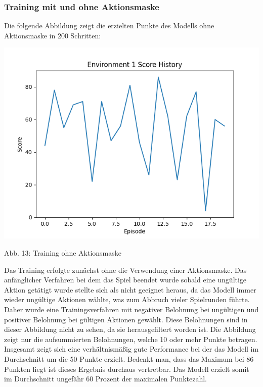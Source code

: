 \subsubsection{Training mit und ohne Aktionsmaske}
\begin{minipage}{\linewidth}
	Die folgende Abbildung zeigt die erzielten Punkte des Modells ohne Aktionsmaske in 200 Schritten:
	
	\vspace{0.5cm}
	\includegraphics[width=1\textwidth]{Bilder/trainingwithoutcancalation}
	
	Abb. 13: Training ohne Aktionsmaske\\
\end{minipage}

Das Training erfolgte zunächst ohne die Verwendung einer Aktionsmaske. Das anfänglicher Verfahren bei dem das Spiel beendet wurde sobald eine ungültige Aktion getätigt wurde stellte sich als nicht geeignet heraus, da das Modell immer wieder ungültige Aktionen wählte, was zum Abbruch vieler Spielrunden führte. Daher wurde eine Trainingsverfahren mit negativer Belohnung bei ungültigen und positiver Belohnung bei gültigen Aktionen gewählt. Diese Belohnungen sind in dieser Abbildung nicht zu sehen, da sie herausgefiltert worden ist. Die Abbildung zeigt nur die aufsummierten Belohnungen, welche 10 oder mehr Punkte betragen. Insgesamt zeigt sich eine verhältnismäßig gute Performance bei der das Modell im Durchschnitt um die 50 Punkte erzielt. Bedenkt man, dass das Maximum bei 86 Punkten liegt ist dieses Ergebnis durchaus vertretbar. Das Modell erzielt somit im Durchschnitt ungefähr 60 Prozent der maximalen Punktezahl.

